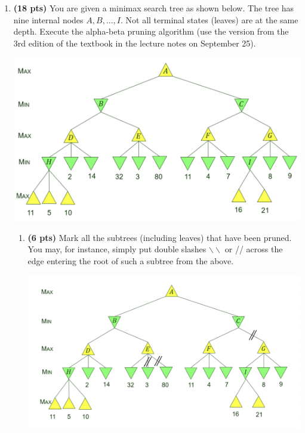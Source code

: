 \documentclass{article}
\begin{document}
\begin{enumerate}
\begin{enumerate}[label=($\alph*$)]

    \end{enumerate}



\item \textbf{(18 pts)} You are given a minimax search tree as shown below. The tree has nine internal nodes $A, B, . . . , I$. Not all terminal states (leaves) are at the same depth. Execute the alpha-beta pruning algorithm (use the version from the 3rd edition of the textbook in the lecture notes on September 25).

\begin{center}
    \includegraphics[scale=0.5]{472-PS4-Q3.png}
\end{center}

\begin{enumerate}[label=($\alph*$)]


    \item \textbf{(6 pts)} Mark all the subtrees (including leaves) that have been pruned. You may, for instance, simply put double slashes $\backslash\backslash$ or // across the edge entering the root of such a subtree from the above.

    \includegraphics[scale=0.5]{472-PS4-Q3-A.png}


\end{enumerate}
\end{enumerate}
\end{document}
